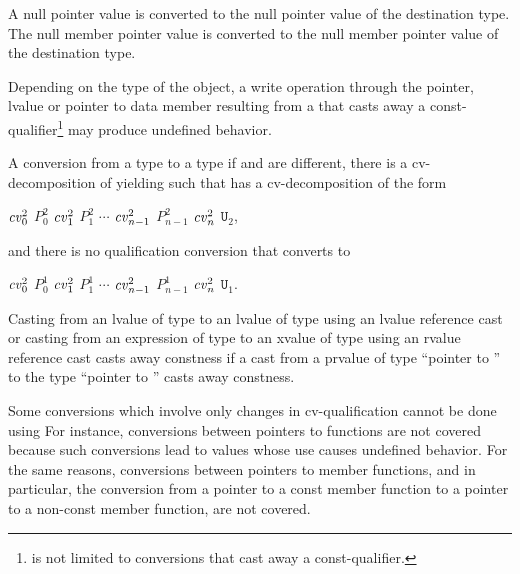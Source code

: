 \pnum
A null pointer value is converted to the null pointer
value of the destination type. The null member pointer
value is converted to the null member pointer value of
the destination type.

\pnum
\begin{note}
Depending on the type of the object, a write operation through the
pointer, lvalue or pointer to data member resulting from a
 that casts away a const-qualifier\footnote{
is not limited to conversions that cast away a
const-qualifier.}
may produce undefined behavior.
\end{note}

\pnum
{}%
A conversion from a type  to a type 
if  and  are different,
there is a cv-decomposition of 
yielding  such that
 has a cv-decomposition of the form
\begin{indented}
$\cv{}_0^2$ $P_0^2$ $\cv{}_1^2$ $P_1^2$ $\cdots$ $\cv{}_{n-1}^2$ $P_{n-1}^2$ $\cv{}_n^2$ $\mathtt{U}_2$,
\end{indented}
and there is no qualification conversion that converts  to
\begin{indented}
$\cv{}_0^2$ $P_0^1$ $\cv{}_1^2$ $P_1^1$ $\cdots$ $\cv{}_{n-1}^2$ $P_{n-1}^1$ $\cv{}_n^2$ $\mathtt{U}_1$.
\end{indented}

\pnum
Casting from an lvalue of type  to an lvalue of type
 using an lvalue reference cast
or casting from an expression of type  to an xvalue of type  using
an rvalue reference cast
casts away constness if a cast from a prvalue of type ``pointer to '' to the type ``pointer to
'' casts away constness.

\pnum
\begin{note}
Some conversions which involve only changes in cv-qualification cannot
be done using  For instance, conversions between
pointers to functions are not covered because such conversions lead to
values whose use causes undefined behavior. For the same reasons,
conversions between pointers to member functions, and in particular, the
conversion from a pointer to a const member function to a pointer to a
non-const member function, are not covered.
\end{note}

